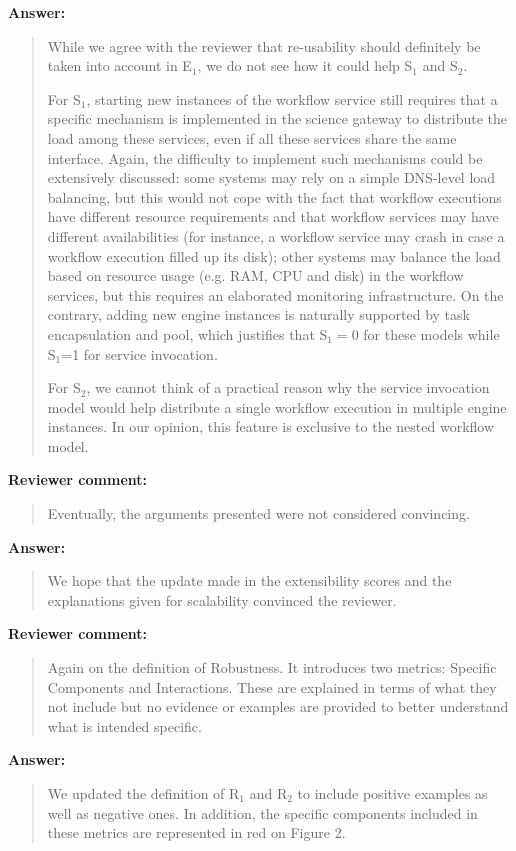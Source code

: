 \documentclass[a4]{article}
\newenvironment{review}%
{\textbf{Reviewer comment:}\begin{quote}}%
{\end{quote}}%
\newenvironment{answer}%
{\textbf{Answer:}\begin{small}\begin{quote}}%
{\end{quote}\end{small}}%
\begin{document}
\begin{answer}
  While we agree with the reviewer that re-usability should
  definitely be taken into account in E$_1$, we do not see how it
  could help S$_1$ and S$_2$.

  For S$_1$, starting new instances of the workflow service still
  requires that a specific mechanism is implemented in the science
  gateway to distribute the load among these services, even if all
  these services share the same interface. Again, the difficulty to
  implement such mechanisms could be extensively discussed: some
  systems may rely on a simple DNS-level load balancing, but this
  would not cope with the fact that workflow executions have different
  resource requirements and that workflow services may have different
  availabilities (for instance, a workflow service may crash in case a
  workflow execution filled up its disk); other systems may balance
  the load based on resource usage (e.g. RAM, CPU and disk) in the
  workflow services, but this requires an elaborated monitoring
  infrastructure. On the contrary, adding new engine instances is
  naturally supported by task encapsulation and pool, which justifies
  that S$_1=0$ for these models while S$_1$=1 for service invocation.

  For S$_2$, we cannot think of a practical reason why the service
  invocation model would help distribute a single workflow execution
  in multiple engine instances. In our opinion, this feature is
  exclusive to the nested workflow model.
\end{answer}

\begin{review}
 Eventually, the arguments presented were not considered convincing.
\end{review}

\begin{answer}
We hope that the update made in the extensibility scores and the
explanations given for scalability convinced the reviewer.
\end{answer}

\begin{review}
  Again on the definition of Robustness. It introduces two metrics:
  Specific Components and Interactions. These are explained in terms
  of what they not include but no evidence or examples are provided to
  better understand what is intended specific. 
\end{review}

\begin{answer}
We updated the definition of R$_1$ and R$_2$ to include
  positive examples as well as negative ones. In addition, the
  specific components included in these metrics are represented in red
  on Figure 2.
\end{answer}
\end{document}
